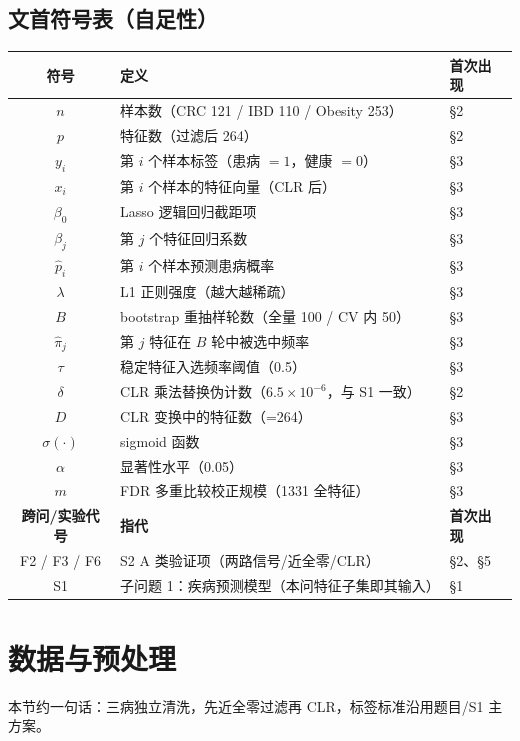 \documentclass{internal-report}
\begin{document}
\subsection{文首符号表（自足性）}
\begin{center}
\footnotesize
\begin{tabular}{c l l}
\toprule
\textbf{符号} & \textbf{定义} & \textbf{首次出现} \\
\midrule
$n$ & 样本数（CRC 121 / IBD 110 / Obesity 253） & §2 \\
$p$ & 特征数（过滤后 264） & §2 \\
$y_i$ & 第 $i$ 个样本标签（患病 $=1$，健康 $=0$） & §3 \\
$x_i$ & 第 $i$ 个样本的特征向量（CLR 后） & §3 \\
$\beta_0$ & Lasso 逻辑回归截距项 & §3 \\
$\beta_j$ & 第 $j$ 个特征回归系数 & §3 \\
$\hat{p}_i$ & 第 $i$ 个样本预测患病概率 & §3 \\
$\lambda$ & L1 正则强度（越大越稀疏） & §3 \\
$B$ & bootstrap 重抽样轮数（全量 100 / CV 内 50） & §3 \\
$\hat{\pi}_j$ & 第 $j$ 特征在 $B$ 轮中被选中频率 & §3 \\
$\tau$ & 稳定特征入选频率阈值（0.5） & §3 \\
$\delta$ & CLR 乘法替换伪计数（$6.5\times10^{-6}$，与 S1 一致） & §2 \\
$D$ & CLR 变换中的特征数（=264） & §3 \\
$\sigma(\cdot)$ & sigmoid 函数 & §3 \\
$\alpha$ & 显著性水平（0.05） & §3 \\
$m$ & FDR 多重比较校正规模（1331 全特征） & §3 \\
\toprule
\textbf{跨问/实验代号} & \textbf{指代} & \textbf{首次出现} \\
\midrule
F2 / F3 / F6 & S2 A 类验证项（两路信号/近全零/CLR） & §2、§5 \\
S1 & 子问题 1：疾病预测模型（本问特征子集即其输入） & §1 \\
\bottomrule
\end{tabular}
\end{center}

\section{数据与预处理}
本节约一句话：三病独立清洗，先近全零过滤再 CLR，标签标准沿用题目/S1 主方案。
\end{document}
